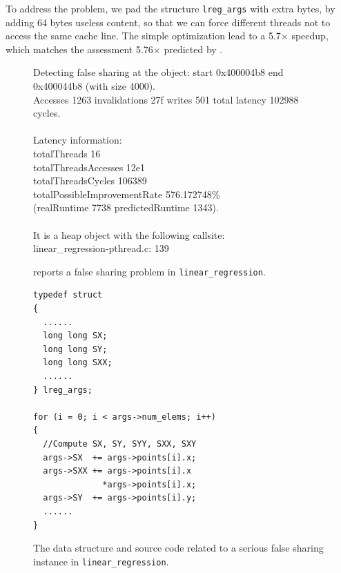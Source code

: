 To address the problem, we pad the structure {\tt lreg\_args} with extra bytes, by adding 64 bytes useless content, so that we can force different threads not to access the same cache line. The simple optimization lead to a 5.7$\times$ speedup, which matches the assessment 5.76$\times$ predicted by \cheetah{}.

\begin{figure}
\begin{minipage}{\columnwidth}

\centering

\fbox
{
\begin{minipage}{3in}
Detecting false sharing at the object: start 0x400004b8 end 0x400044b8 (with size 4000). \\
Accesses 1263 invalidations 27f writes 501 total latency 102988 cycles.\\
\\
Latency information: \\
totalThreads 16 \\
totalThreadsAccesses 12e1 \\
totalThreadsCycles 106389 \\
totalPossibleImprovementRate 576.172748\% \\
(realRuntime 7738 predictedRuntime 1343).\\
\\
It is a heap object with the following callsite:\\
linear\_regression-pthread.c: 139
\end{minipage}
}
\vspace{1em}
\caption{\cheetah{} reports a false sharing problem in \texttt{linear\_regression}.}
\label{fig:lr}
\end{minipage}
\end{figure}


\begin{figure}
\begin{verbatim}
typedef struct
{
  ......  
  long long SX;
  long long SY;
  long long SXX;
  ......
} lreg_args;	

for (i = 0; i < args->num_elems; i++)
{
  //Compute SX, SY, SYY, SXX, SXY
  args->SX  += args->points[i].x;
  args->SXX += args->points[i].x
              *args->points[i].x;
  args->SY  += args->points[i].y;
  ......
}
\end{verbatim}
\caption{The data structure and source code related to a serious false sharing instance in \texttt{linear\_regression}.}
\label{lr:code}
\end{figure}

